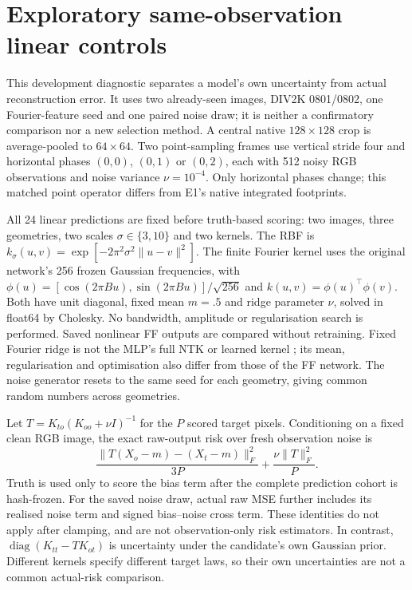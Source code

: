 \section{Exploratory same-observation linear controls}\label{app:controls}
This development diagnostic separates a model's own uncertainty from
actual reconstruction error. It uses two already-seen images, DIV2K
0801/0802, one Fourier-feature seed and one paired noise draw; it is
neither a confirmatory comparison nor a new selection method.
A central native $128\times128$ crop is average-pooled to $64\times64$.
Two point-sampling frames use vertical stride four and horizontal phases
$(0,0)$, $(0,1)$ or $(0,2)$, each with 512 noisy RGB observations and
noise variance $\nu=10^{-4}$. Only horizontal phases change; this matched
point operator differs from E1's native integrated footprints.

All 24 linear predictions are fixed before truth-based scoring: two
images, three geometries, two scales $\sigma\in\{3,10\}$ and two kernels.
The RBF is $k_\sigma(u,v)=\exp[-2\pi^2\sigma^2\|u-v\|^2]$. The finite
Fourier kernel uses the original network's 256 frozen Gaussian frequencies,
with $\phi(u)=[\cos(2\pi Bu),\sin(2\pi Bu)]/\sqrt{256}$ and
$k(u,v)=\phi(u)^\top\phi(v)$. Both have unit diagonal, fixed mean $m=.5$
and ridge parameter $\nu$, solved in float64 by Cholesky. No bandwidth,
amplitude or regularisation search is performed. Saved nonlinear FF
outputs are compared without retraining. Fixed Fourier ridge is not the
MLP's full NTK or learned kernel \citep{tancik2020fourier}; its mean,
regularisation and optimisation also differ from those of the FF network.
The noise generator resets to the same seed for each geometry, giving
common random numbers across geometries.

Let $T=K_{to}(K_{oo}+\nu I)^{-1}$ for the $P$ scored target pixels.
Conditioning on a fixed clean RGB image, the exact raw-output risk over
fresh observation noise is
\begin{equation*}
\frac{\|T(X_o-m)-(X_t-m)\|_F^2}{3P}
+\frac{\nu\|T\|_F^2}{P}.
\end{equation*}
Truth is used only to score the bias term after the complete prediction
cohort is hash-frozen. For the saved noise draw, actual raw MSE further
includes its realised noise term and signed bias--noise cross term.
These identities do not apply after clamping, and are not observation-only
risk estimators. In contrast, $\operatorname{diag}(K_{tt}-TK_{ot})$ is
uncertainty under the candidate's own Gaussian prior. Different kernels
specify different target laws, so their own uncertainties are not a common
actual-risk comparison.

